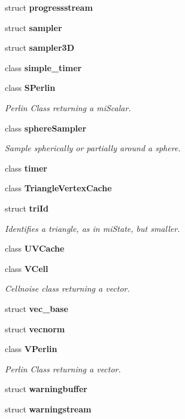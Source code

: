 \begin{CompactItemize}
struct {\bf progressstream}
\item 
struct {\bf sampler}
\item 
struct {\bf sampler3D}
\item 
class {\bf simple\_\-timer}
\item 
class {\bf SPerlin}
\begin{CompactList}\small\item\em Perlin Class returning a mi\-Scalar. \item\end{CompactList}\item 
class {\bf sphere\-Sampler}
\begin{CompactList}\small\item\em Sample spherically or partially around a sphere. \item\end{CompactList}\item 
class {\bf timer}
\item 
class {\bf Triangle\-Vertex\-Cache}
\item 
struct {\bf tri\-Id}
\begin{CompactList}\small\item\em Identifies a triangle, as in mi\-State, but smaller. \item\end{CompactList}\item 
class {\bf UVCache}
\item 
class {\bf VCell}
\begin{CompactList}\small\item\em Cellnoise class returning a vector. \item\end{CompactList}\item 
struct {\bf vec\_\-base}
\item 
struct {\bf vecnorm}
\item 
class {\bf VPerlin}
\begin{CompactList}\small\item\em Perlin Class returning a vector. \item\end{CompactList}\item 
struct {\bf warningbuffer}
\item 
struct {\bf warningstream}
\end{CompactItemize}
